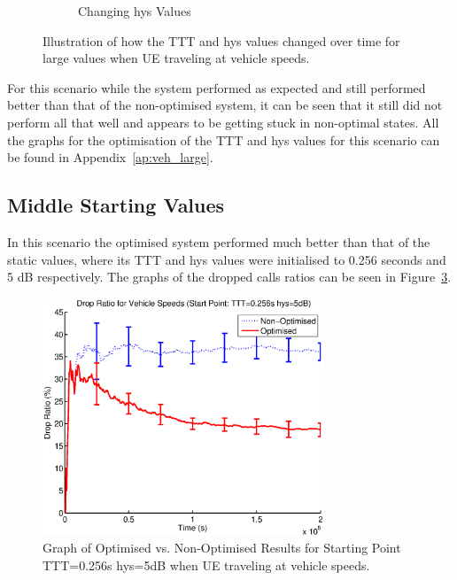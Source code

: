 \begin{figure}[H]
\begin{subfigure}[b]{0.49\textwidth}
                \caption{Changing hys Values}
                \label{fig:veh_high_hys}
        \end{subfigure}
        \caption{Illustration of how the TTT and hys values changed over time for large values when UE traveling at vehicle speeds.}\label{fig:veh_high_ttthys}
\end{figure}
For this scenario while the system performed as expected and still performed better than that of the non-optimised system, it can be seen that it still did not perform all that well and appears to be getting stuck in non-optimal states. All the graphs for the optimisation of the TTT and hys values for this scenario can be found in Appendix~\ref{ap:veh_large}.
\subsection{Middle Starting Values}
In this scenario the optimised system performed much better than that of the static values, where its TTT and hys values were initialised to 0.256 seconds and 5 dB respectively. The graphs of the dropped calls ratios can be seen in Figure~\ref{fig:veh_mid_drop}.
\begin{figure}[H]
  \begin{center}
    	  \includegraphics[width=0.75\textwidth]{figures/vehicle_figures/vehmid.eps}
    \end{center}
    \caption{Graph of Optimised vs. Non-Optimised Results for Starting Point TTT=0.256s hys=5dB when UE traveling at vehicle speeds.}
    \label{fig:veh_mid_drop}
\end{figure}
